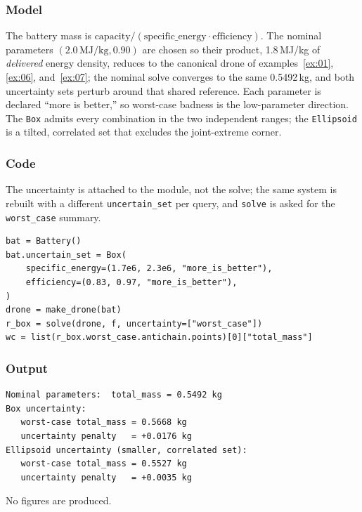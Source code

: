 \documentclass[11pt,a4paper]{article}
\begin{document}
\subsubsection*{Model}

The battery mass is
$\text{capacity} / (\text{specific\_energy} \cdot \text{efficiency})$.
The nominal parameters $(2.0\,\text{MJ/kg}, 0.90)$ are chosen so their
product, 1.8\,MJ/kg of \emph{delivered} energy density, reduces to the
canonical drone of examples~\ref{ex:01}, \ref{ex:06}, and~\ref{ex:07};
the nominal solve converges to the same 0.5492\,kg, and both
uncertainty sets perturb around that shared reference. Each parameter
is declared ``more is better,'' so worst-case badness is the
low-parameter direction. The \texttt{Box} admits every combination in
the two independent ranges; the \texttt{Ellipsoid} is a tilted,
correlated set that excludes the joint-extreme corner.

\subsubsection*{Code}

The uncertainty is attached to the module, not the solve; the same
system is rebuilt with a different \texttt{uncertain\_set} per query,
and \texttt{solve} is asked for the \texttt{worst\_case} summary.

\begin{lstlisting}
bat = Battery()
bat.uncertain_set = Box(
    specific_energy=(1.7e6, 2.3e6, "more_is_better"),
    efficiency=(0.83, 0.97, "more_is_better"),
)
drone = make_drone(bat)
r_box = solve(drone, f, uncertainty=["worst_case"])
wc = list(r_box.worst_case.antichain.points)[0]["total_mass"]
\end{lstlisting}

\subsubsection*{Output}

\begin{lstlisting}[language={},numbers=none,keywordstyle={}]
Nominal parameters:  total_mass = 0.5492 kg
Box uncertainty:
   worst-case total_mass = 0.5668 kg
   uncertainty penalty   = +0.0176 kg
Ellipsoid uncertainty (smaller, correlated set):
   worst-case total_mass = 0.5527 kg
   uncertainty penalty   = +0.0035 kg
\end{lstlisting}

No figures are produced.
\end{document}
